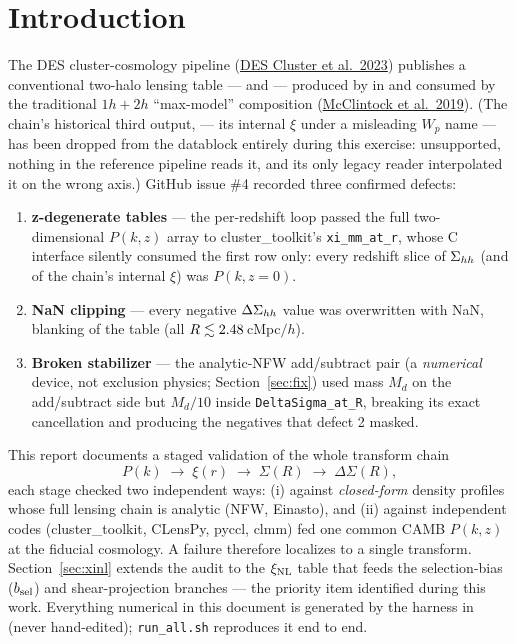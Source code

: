 \section{Introduction}
\label{sec:intro}

The DES cluster-cosmology pipeline
(\href{https://arxiv.org/abs/2309.06593}{DES Cluster et al.\ 2023})
publishes a conventional two-halo lensing table ---
 and  --- produced
by
 in  and consumed
by the traditional $1h{+}2h$ ``max-model'' composition
(\href{https://arxiv.org/abs/1805.00039}{McClintock et al.\ 2019}).
(The chain's historical third output,  --- its internal
$\xi$ under a misleading $W_p$ name --- has been dropped from the
datablock entirely during this exercise: unsupported, nothing in the
reference pipeline reads it, and its only legacy reader interpolated
it on the wrong axis.)
GitHub issue \#4 recorded three confirmed defects:

\begin{enumerate}
\item \textbf{z-degenerate tables} --- the per-redshift loop passed the
  full two-dimensional $P(k,z)$ array to cluster\_toolkit's
  \texttt{xi\_mm\_at\_r}, whose C interface silently consumed the first
  row only: every redshift slice of $\Sigma_{hh}$ (and of the chain's
  internal $\xi$) was $P(k, z{=}0)$.
\item \textbf{NaN clipping} --- every negative $\Delta\Sigma_{hh}$ value was
  overwritten with NaN, blanking \nanFracBefore{} of the table (all
  $R \lesssim 2.48\,$cMpc$/h$).
\item \textbf{Broken stabilizer} --- the analytic-NFW add/subtract pair
  (a \emph{numerical} device, not exclusion physics;
  Section~\ref{sec:fix}) used mass $M_d$ on the add/subtract side but
  $M_d/10$ inside \texttt{DeltaSigma\_at\_R}, breaking its exact
  cancellation and producing the negatives that defect 2 masked.
\end{enumerate}

This report documents a staged validation of the whole transform chain
\[ P(k) \;\to\; \xi(r) \;\to\; \Sigma(R) \;\to\; \Delta\Sigma(R), \]
each stage checked two independent ways: (i) against
\emph{closed-form} density profiles whose full lensing chain is
analytic (NFW, Einasto), and (ii) against independent codes
(cluster\_toolkit, CLensPy, pyccl, clmm) fed one common CAMB
$P(k,z)$ at the fiducial cosmology. A failure therefore localizes to a
single transform. Section~\ref{sec:xinl} extends the audit to the
$\xi_{\rm NL}$ table that feeds the selection-bias ($b_{\rm sel}$) and
shear-projection branches --- the priority item identified during this
work. Everything numerical in this document is generated by the
harness in  (never
hand-edited); \texttt{run\_all.sh} reproduces it end to end.
